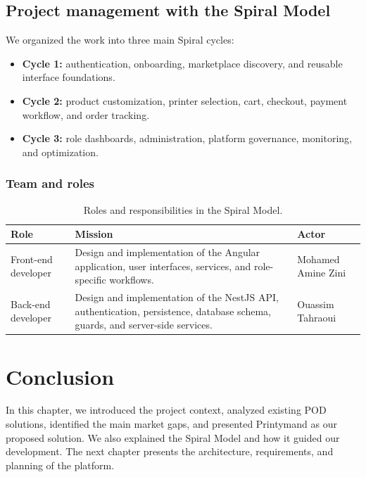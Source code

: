 \subsection{Project management with the Spiral Model}
We organized the work into three main Spiral cycles:

\begin{itemize}
    \item \textbf{Cycle 1:} authentication, onboarding, marketplace discovery, and reusable interface foundations.
    \item \textbf{Cycle 2:} product customization, printer selection, cart, checkout, payment workflow, and order tracking.
    \item \textbf{Cycle 3:} role dashboards, administration, platform governance, monitoring, and optimization.
\end{itemize}

\subsubsection{Team and roles}
\begin{table}[!htpb]
    \caption{Roles and responsibilities in the Spiral Model.}
    \centering
    \begin{tabular}{|p{3cm}|p{6cm}|p{4cm}|}
        \hline
        \textbf{Role} & \textbf{Mission} & \textbf{Actor} \\ \hline
        Front-end developer & Design and implementation of the Angular application, user interfaces, services, and role-specific workflows. & Mohamed Amine Zini \\ \hline
        Back-end developer & Design and implementation of the NestJS API, authentication, persistence, database schema, guards, and server-side services. & Ouassim Tahraoui \\ \hline
    \end{tabular}
    \label{tab:spiral_roles}
\end{table}

\section{Conclusion}
In this chapter, we introduced the project context, analyzed existing POD solutions, identified the main market gaps, and presented Printymand as our proposed solution.
We also explained the Spiral Model and how it guided our development.
The next chapter presents the architecture, requirements, and planning of the platform.
